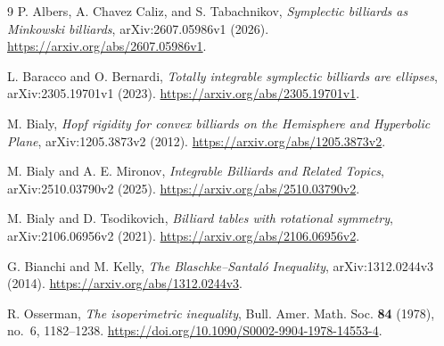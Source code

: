 \documentclass[11pt]{amsart}
\theoremstyle{remark}
\begin{document}
\begin{thebibliography}{9}
P. Albers, A. Chavez Caliz, and S. Tabachnikov,
\emph{Symplectic billiards as Minkowski billiards},
arXiv:2607.05986v1 (2026).
\url{https://arxiv.org/abs/2607.05986v1}.

L. Baracco and O. Bernardi,
\emph{Totally integrable symplectic billiards are ellipses},
arXiv:2305.19701v1 (2023).
\url{https://arxiv.org/abs/2305.19701v1}.

M. Bialy,
\emph{Hopf rigidity for convex billiards on the Hemisphere and Hyperbolic Plane},
arXiv:1205.3873v2 (2012).
\url{https://arxiv.org/abs/1205.3873v2}.

M. Bialy and A. E. Mironov,
\emph{Integrable Billiards and Related Topics},
arXiv:2510.03790v2 (2025).
\url{https://arxiv.org/abs/2510.03790v2}.

M. Bialy and D. Tsodikovich,
\emph{Billiard tables with rotational symmetry},
arXiv:2106.06956v2 (2021).
\url{https://arxiv.org/abs/2106.06956v2}.

G. Bianchi and M. Kelly,
\emph{The Blaschke--Santal\'o Inequality},
arXiv:1312.0244v3 (2014).
\url{https://arxiv.org/abs/1312.0244v3}.

R. Osserman,
\emph{The isoperimetric inequality},
Bull. Amer. Math. Soc. \textbf{84} (1978), no.~6, 1182--1238.
\url{https://doi.org/10.1090/S0002-9904-1978-14553-4}.
\end{thebibliography}
\end{document}
